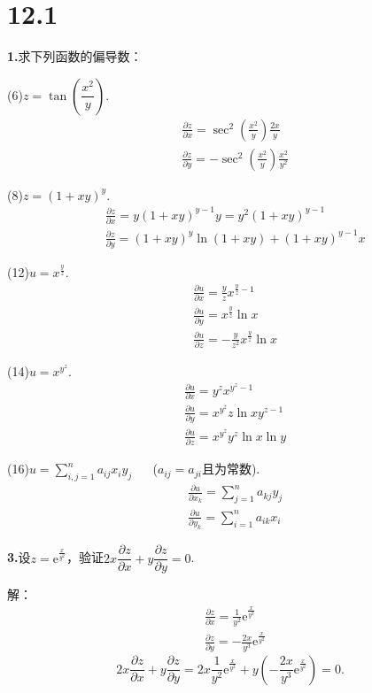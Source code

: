 \documentclass[12pt, a4paper]{article}
\newcommand{\e}{\mathrm{e}}
\begin{document}
\section*{12.1}
\textbf{1.}求下列函数的偏导数：

(6)\(z = \tan\left(\dfrac{x^2}{y}\right)\).
\begin{align*}
&\frac{\partial z}{\partial x} = \sec^2\left(\frac{x^2}{y}\right)\frac{2x}{y}\\
&\frac{\partial z}{\partial y} = -\sec^2\left(\frac{x^2}{y}\right)\frac{x^2}{y^2}
\end{align*}

(8)\(z = (1 + xy)^y\).
\begin{align*}
&\frac{\partial z}{\partial x} = y(1 + xy)^{y-1}y = y^2(1 + xy)^{y-1}\\
&\frac{\partial z}{\partial y} = (1 + xy)^y\ln(1 + xy) + (1 + xy)^{y-1}x
\end{align*}

(12)\(u = x^{\frac{y}{z}}\).
\begin{align*}
&\frac{\partial u}{\partial x} = \frac{y}{z}x^{\frac{y}{z}-1}\\
&\frac{\partial u}{\partial y} = x^{\frac{y}{z}}\ln x\\
&\frac{\partial u}{\partial z} = -\frac{y}{z^2}x^{\frac{y}{z}}\ln x
\end{align*}

(14)\(u = x^{y^z}\).
\begin{align*}
&\frac{\partial u}{\partial x} = y^zx^{y^z-1}\\
&\frac{\partial u}{\partial y} = x^{y^z}z\ln x y^{z-1}\\
&\frac{\partial u}{\partial z} = x^{y^z}y^z\ln x \ln y
\end{align*}

(16)\(u = \sum\limits_{i,j = 1}^n a_{ij}x_iy_j\) \(\quad\) (\(a_{ij} = a_{ji}\)且为常数).
\begin{align*}
&\frac{\partial u}{\partial x_k} = \sum\limits_{j=1}^n a_{kj}y_j\\
&\frac{\partial u}{\partial y_k} = \sum\limits_{i=1}^n a_{ik}x_i
\end{align*}

\textbf{3.}设\(z = \e^{\frac{x}{y^2}}\)，验证\(2x\dfrac{\partial z}{\partial x} + y\dfrac{\partial z}{\partial y} = 0\).

解：
\begin{align*}
&\frac{\partial z}{\partial x} = \frac{1}{y^2}\e^{\frac{x}{y^2}}\\
&\frac{\partial z}{\partial y} = -\frac{2x}{y^3}\e^{\frac{x}{y^2}}
\end{align*}
\[2x\frac{\partial z}{\partial x} + y\frac{\partial z}{\partial y} = 2x\frac{1}{y^2}\e^{\frac{x}{y^2}} + y\left(-\frac{2x}{y^3}\e^{\frac{x}{y^2}}\right) = 0.\]
\end{document}
